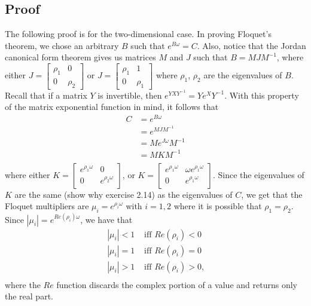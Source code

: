 \documentclass[a4paper]{article}
\begin{document}
\subsection{Proof}
The following proof is for the two-dimensional case. In proving Floquet's theorem, we chose an arbitrary $B$ such that $e^{B \omega} = C$. 
Also, notice that the Jordan canonical form theorem gives us matrices $M$ and $J$ such that $B = MJM^{-1}$, where either $J = \begin{bmatrix}
    \rho_1 & 0 \\
    0 & \rho_2
\end{bmatrix}$ or $J = \begin{bmatrix}
    \rho_1 & 1 \\
    0 & \rho_1
\end{bmatrix}$ where $\rho_1$, $\rho_2$ are the eigenvalues of $B$. Recall that if a matrix $Y$ is invertible, then $e^{Y X Y^{-1}} = Y e^{X} Y^{-1}.$
With this property of the matrix exponential function in mind, it follows that
\begin{equation*}
\begin{split}
    C &= e^{B\omega}\\
      &= e^{MJM^{-1}}\\
      &= M e^{J\omega} M^{-1}\\
      &= M K M^{-1}\\
\end{split}
\end{equation*}
where either $K = \begin{bmatrix}
    e^{\rho_{1}\omega} & 0 \\
    0 & e^{\rho_{2}\omega}\\
\end{bmatrix}$, or $K = \begin{bmatrix}
    e^{\rho_{1}\omega} & \omega e^{\rho_{1}\omega}\\
    0 & e^{\rho_{1}\omega}\\
\end{bmatrix}$.
Since the eigenvalues of $K$ are the same (show why exercise 2.14) as the eigenvalues of $C$, we get that the Floquet multipliers are $\mu_i = e^{\rho_{i}\omega}$ with $i = 1,2$ where it is possible that $\rho_1 = \rho_2$. Since $|\mu_i| = e^{Re(\rho_i)\omega}$, we have that
\begin{equation*}
\begin{split}
    |\mu_i| < 1 &\text{ iff } Re(\rho_i) < 0 \\
    |\mu_i| = 1 &\text{ iff } Re(\rho_i) = 0 \\
    |\mu_i| > 1 &\text{ iff } Re(\rho_i) > 0\text{,} \\
\end{split}
\end{equation*} where the $Re$ function discards the complex portion of a value and returns only the real part.
\end{document}
